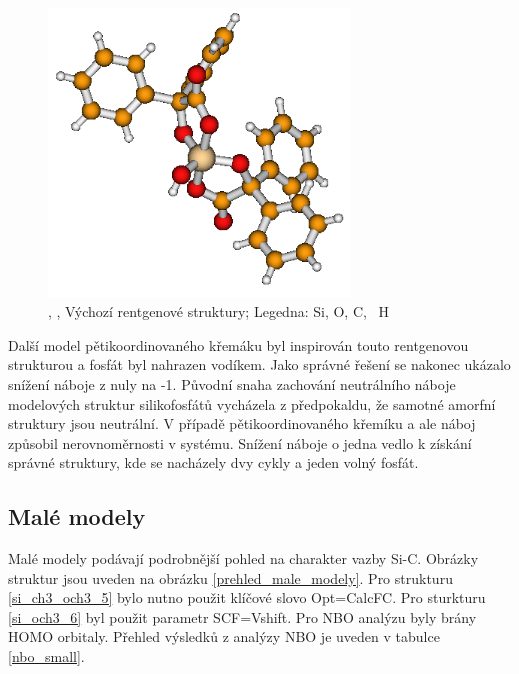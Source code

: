 \documentclass[
  digital, %
  table,   %
  lof,     %
  lot,     %
  oneside,
]{fithesis3}
\begin{document}
\begin{figure}
\begin{center}
\includegraphics[width=8cm]{rtg_5_koordinace.png}
\caption{ , \cite{rtg_5}, Výchozí rentgenové struktury;  Legedna:  Si,  O,  C, ~H}
\label{rtg_5}
\end{center}
\end{figure}
Další model pětikoordinovaného křemáku byl inspirován touto rentgenovou strukturou a fosfát byl nahrazen vodíkem. Jako správné řešení se nakonec ukázalo snížení náboje z nuly na -1. Původní snaha zachování neutrálního náboje modelových struktur silikofosfátů vycházela z předpokaldu, že samotné amorfní struktury jsou neutrální. V případě pětikoordinovaného křemíku a ale náboj způsobil nerovnoměrnosti v systému. Snížení náboje o jedna vedlo k získání správné struktury, kde se nacházely dvy cykly a jeden volný fosfát.




\subsection{Malé modely}
Malé modely podávají podrobnější pohled na charakter vazby Si-C. Obrázky struktur jsou uveden na obrázku \ref{prehled_male_modely}. Pro strukturu  \ref{si_ch3_och3_5} bylo nutno použit klíčové slovo Opt=CalcFC. Pro sturkturu  \ref{si_och3_6} byl použit parametr SCF=Vshift. Pro NBO analýzu byly brány HOMO orbitaly. Přehled výsledků z analýzy NBO je uveden v tabulce \ref{nbo_small}.
\end{document}
